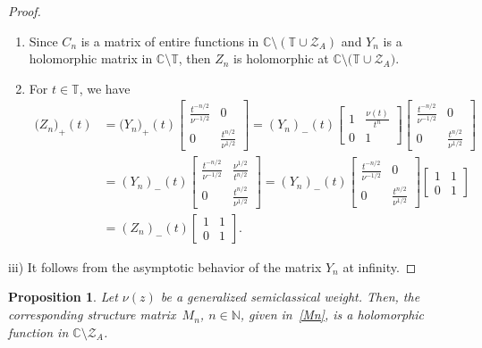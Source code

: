 \documentclass[12pt]{amsart}
\newtheorem{proposition}{Proposition}[section]
\begin{document}
\begin{proof}
\begin{enumerate}[\rm i)]
\item
Since \( C_n \) is a matrix of entire functions in \( \mathbb{C}\setminus ( \mathbb{T}\cup \mathcal{Z}_A ) \) and \( Y_n \) is a holomorphic matrix in \( \mathbb{C }\setminus\mathbb{T} \), then \( Z_n \) is holomorphic at \( \mathbb{C}\setminus \big( \mathbb{T}\cup \mathcal{Z}_A \big) \).
\item
For \( t\in\mathbb{T} \), we have
\begin{align*}
{(Z_n})_{+}(t) &= {(Y_n})_{+}(t){\begin{bmatrix}
\frac{t^{-n/2}}{\nu^{-1/2}} & 0 \\
0 & \frac{t^{n/2}}{\nu^{1/2}}
\end{bmatrix}} 
 = {(Y_n)}_{-}(t)
\begin{bmatrix}
1 & \frac{\nu(t)}{t^n}\\
0 & 1
\end{bmatrix}{\begin{bmatrix}
\frac{t^{-n/2}}{\nu^{-1/2}} & 0 \\
0 & \frac{t^{n/2}}{\nu^{1/2}}
\end{bmatrix}}\\
& = {(Y_n)}_{-}(t)
\begin{bmatrix}
\frac{t^{-n/2}}{\nu^{-1/2}} & \frac{\nu^{1/2}}{t^{n/2}} \\
0 & \frac{t^{n/2}}{\nu^{1/2}}
\end{bmatrix} 
 = {(Y_n)}_{-}(t)
{\begin{bmatrix}
\frac{t^{-n/2}}{\nu^{-1/2}} & 0 \\
0 & \frac{t^{n/2}}{\nu^{1/2}}
\end{bmatrix}}\begin{bmatrix}
1 & 1\\
0 & 1
\end{bmatrix}\\
& = {(Z_n)}_{-}(t)
\begin{bmatrix}
1 & 1\\
0 & 1
\end{bmatrix}.
\end{align*}
\end{enumerate}

{\noindent}iii) It follows from the asymptotic behavior of the matrix \( Y_n \) at infinity. 
\end{proof}


\begin{proposition}
\label{teo:geral}
Let \( \nu(z) \) be a
generalized
semiclassical weight.
Then, the corresponding structure matrix~\( M_n \), \( n\in\mathbb{N} \), given in~\eqref{Mn}, is a holomorphic function in \( \mathbb {C} \setminus \mathcal{Z}_A \).
\end{proposition}
\end{document}
